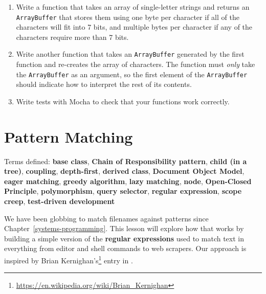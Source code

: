 \documentclass[krantzl]{krantz}
\newcommand{\chapref}[1]{Chapter~\ref{#1}}
\newcommand{\glossref}[1]{\textbf{#1}}
\newcommand{\hreffoot}[2]{{#1}\footnote{\href{#2}{#2}}}
\begin{document}
\begin{enumerate}

\item 

Write a function that takes an array of single-letter strings
    and returns an \texttt{ArrayBuffer} that stores them using one byte per character
    if all of the characters will fit into 7 bits,
    and multiple bytes per character if any of the characters require more than 7 bits.



\item 

Write another function that takes an \texttt{ArrayBuffer} generated by the first function
    and re-creates the array of characters.
    The function must \emph{only} take the \texttt{ArrayBuffer} as an argument,
    so the first element of the \texttt{ArrayBuffer} should indicate
    how to interpret the rest of its contents.



\item 

Write tests with Mocha to check that your functions work correctly.



\end{enumerate}

\chapter{Pattern Matching}\label{pattern-matching}


\noindent 
  Terms defined: \glossref{base class}, \glossref{Chain of Responsibility pattern}, \glossref{child (in a tree)}, \glossref{coupling}, \glossref{depth-first}, \glossref{derived class}, \glossref{Document Object Model}, \glossref{eager matching}, \glossref{greedy algorithm}, \glossref{lazy matching}, \glossref{node}, \glossref{Open-Closed Principle}, \glossref{polymorphism}, \glossref{query selector}, \glossref{regular expression}, \glossref{scope creep}, \glossref{test-driven development}



We have been globbing to match filenames against patterns since \chapref{systems-programming}.
This lesson will explore how that works
by building a simple version of the \glossref{regular expressions}
used to match text in everything from editor and shell commands to web scrapers.
Our approach is inspired by \hreffoot{Brian Kernighan’s}{https://en.wikipedia.org/wiki/Brian\_Kernighan} entry
in \cite{Oram2007}.
\end{document}
